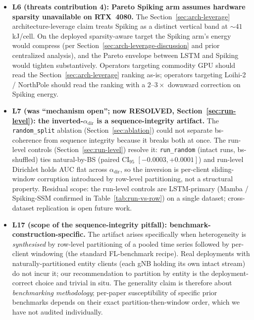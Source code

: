 \documentclass[journal]{IEEEtran}
\newcommand{\alphadir}{\ensuremath{\alpha_{\mathrm{dir}}}}
\begin{document}
\begin{itemize}
  \item \textbf{L6 (threats contribution 4): Pareto Spiking arm assumes hardware sparsity unavailable on RTX~4080.} The Section~\ref{sec:arch-leverage} architecture-leverage claim treats Spiking as a distinct vertical band at $\sim 41$\,kJ/cell. On the deployed sparsity-aware target the Spiking arm's energy would compress (per Section~\ref{sec:arch-leverage-discussion} and prior centralized analysis), and the Pareto envelope between LSTM and Spiking would tighten substantively. Operators targeting commodity GPU should read the Section~\ref{sec:arch-leverage} ranking as-is; operators targeting Loihi-2 / NorthPole should read the ranking with a $2$--$3\times$ downward correction on Spiking energy.

  \item \textbf{L7 (was ``mechanism open''; now RESOLVED, Section~\ref{sec:run-level}): the inverted-$\alphadir$ is a sequence-integrity artifact.} The \lstinline|random_split| ablation (Section~\ref{sec:ablation}) could not separate bs-coherence from sequence integrity because it breaks both at once. The run-level controls (Section~\ref{sec:run-level}) resolve it: \lstinline|run_random| (intact runs, bs-shuffled) ties natural-by-BS (paired CI$_{95}$ $[-0.0003, +0.0001]$) and run-level Dirichlet holds AUC flat across $\alphadir$, so the inversion is per-client sliding-window corruption introduced by row-level partitioning, not a structural property. Residual scope: the run-level controls are LSTM-primary (Mamba / Spiking-SSM confirmed in Table~\ref{tab:run-vs-row}) on a single dataset; cross-dataset replication is open future work.

  \item \textbf{L17 (scope of the sequence-integrity pitfall): benchmark-construction-specific.} The artifact arises specifically when heterogeneity is \emph{synthesised} by row-level partitioning of a pooled time series followed by per-client windowing (the standard FL-benchmark recipe). Real deployments with naturally-partitioned entity clients (each gNB holding its own intact stream) do not incur it; our recommendation to partition by entity is the deployment-correct choice and trivial in situ. The generality claim is therefore about \emph{benchmarking methodology}; per-paper susceptibility of specific prior benchmarks depends on their exact partition-then-window order, which we have not audited individually.


\end{itemize}
\end{document}
